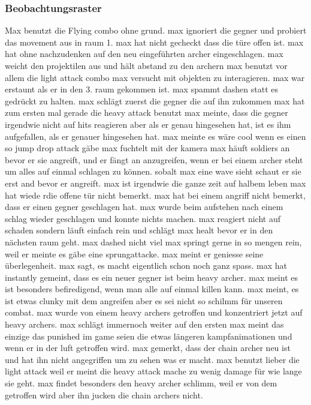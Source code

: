 \documentclass[../Main.tex]{subfiles}
\begin{document}
\subsubsection{Beobachtungsraster}
Max benutzt die Flying combo ohne grund.
max ignoriert die gegner und probiert das movement aus in raum 1.
max hat nicht gecheckt dass die türe offen ist.
max hat ohne nachzudenken auf den neu eingeführten archer eingeschlagen.
max weicht den projektilen aus und hält abstand zu den archern
max benutzt vor allem die light attack combo
max versucht mit objekten zu interagieren.
max war erstaunt als er in den 3. raum gekommen ist.
max spammt dashen statt es gedrückt zu halten.
max schlägt zuerst die gegner die auf ihn zukommen
max hat zum ersten mal gerade die heavy attack benutzt
max meinte, dass die gegner irgendwie nicht auf hits reagieren aber als er genau hingesehen hat, ist es ihm aufgefallen, als er genauer hingesehen hat.
max meinte es wäre cool wenn es einen so jump drop attack gäbe
max fuchtelt mit der kamera
max häuft soldiers an bevor er sie angreift, und er fängt an anzugreifen, wenn er bei einem archer steht um alles auf einmal schlagen zu können.
sobalt max eine wave sieht schaut er sie erst and bevor er angreift.
max ist irgendwie die ganze zeit auf halbem leben
max hat wiede rdie offene tür nicht bemerkt.
max hat bei einem angriff nicht bemerkt, dass er einen gegner geschlagen hat.
max wurde beim aufstehen nach einem schlag wieder geschlagen und konnte nichts machen.
max reagiert nicht auf schaden sondern läuft einfach rein und schlägt
max healt bevor er in den nächsten raum geht.
max dashed nicht viel
max springt gerne in so mengen rein, weil er meinte es gäbe eine sprungattacke.
max meint er geniesse seine überlegenheit.
max sagt, es macht eigentlich schon noch ganz spass.
max hat instantly gemeint, dass es ein neuer gegner ist beim heavy archer.
max meint es ist besonders befiredigend, wenn man alle auf einmal killen kann.
max meint, es ist etwas clunky mit dem angreifen aber es sei nicht so schilmm für unseren combat.
max wurde von einem heavy archers getroffen und konzentriert jetzt auf heavy archers.
max schlägt immernoch weiter auf den ersten
max meint das einzige das punished im game seien die etwas längeren kampfanimationen und wenn er in der luft getroffen wird.
max gemerkt, dass der chain archer neu ist und hat ihn nicht angegriffen um zu sehen was er macht.
max benutzt lieber die light attack weil er meint die heavy attack mache zu wenig damage für wie lange sie geht.
max findet besonders den heavy archer schlimm, weil er von dem getroffen wird aber ihn jucken die chain archers nicht.
\end{document}
